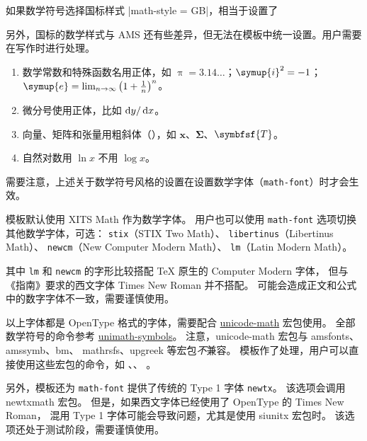 \documentclass[a4paper]{ltxdoc}
\makeatletter
\DeclareRobustCommand\pkg{\textsf}
\DeclareRobustCommand\opt{\texttt}
\def\DescribeOption{\leavevmode\@bsphack\begingroup\MakePrivateLetters
  \Describe@Option}
\def\Describe@Option#1{\endgroup
              \marginpar{\raggedleft\PrintDescribeOption{#1}}%
              \SpecialEnvIndex{#1}\@esphack\ignorespaces}
\makeatother
\begin{document}
如果数学符号选择国标样式 |math-style = GB|，相当于设置了
\begin{latex}
\end{latex}

另外，国标的数学样式与 AMS 还有些差异，但无法在模板中统一设置。用户需要在写作时进行处理。
\begin{enumerate}
  \item 数学常数和特殊函数名用正体，如 $\uppi = 3.14\dots$；$\symup{i}^2 = -1$；
    $\symup{e} = \lim_{n \to \infty} \left( 1 + \frac{1}{n} \right)^n$。
  \item 微分号使用正体，比如 $\mathop{}\!\mathrm{d} y / \mathop{}\!\mathrm{d} x$。
  \item 向量、矩阵和张量用粗斜体（），如 $\symbf{x}$、$\symbf{\Sigma}$、$\symbfsf{T}$。
  \item 自然对数用 $\ln x$ 不用 $\log x$。
\end{enumerate}

需要注意，上述关于数学符号风格的设置在设置数学字体（\opt{math-font}）时才会生效。

\DescribeOption{math-font}
模板默认使用 XITS Math 作为数学字体。
用户也可以使用 \opt{math-font} 选项切换其他数学字体，可选：
\opt{stix}（STIX Two Math）、
\opt{libertinus}（Libertinus Math）、
\opt{newcm}（New Computer Modern Math）、
\opt{lm}（Latin Modern Math）。

其中 \opt{lm} 和 \opt{newcm} 的字形比较搭配 TeX 原生的 Computer Modern 字体，
但与《指南》要求的西文字体 Times New Roman 并不搭配。
可能会造成正文和公式中的数字字体不一致，需要谨慎使用。

以上字体都是 OpenType 格式的字体，需要配合
\href{http://mirrors.ctan.org/macros/latex/contrib/unicode-math/unicode-math.pdf}{\pkg{unicode-math}}
宏包使用。
全部数学符号的命令参考
\href{http://mirrors.ctan.org/macros/latex/contrib/unicode-math/unimath-symbols.pdf}{\pkg{unimath-symbols}}。
注意，\pkg{unicode-math} 宏包与 \pkg{amsfonts}、\pkg{amssymb}、\pkg{bm}、
\pkg{mathrsfs}、\pkg{upgreek} 等宏包\emph{不}兼容。
模板作了处理，用户可以直接使用这些宏包的命令，如 、、
。

另外，模板还为 \opt{math-font} 提供了传统的 Type 1 字体 \opt{newtx}。
该选项会调用 \pkg{newtxmath} 宏包。
但是，如果西文字体已经使用了 OpenType 的 Times New Roman，
混用 Type 1 字体可能会导致问题，尤其是使用 \pkg{siunitx} 宏包时。
该选项还处于测试阶段，需要谨慎使用。
\end{document}

